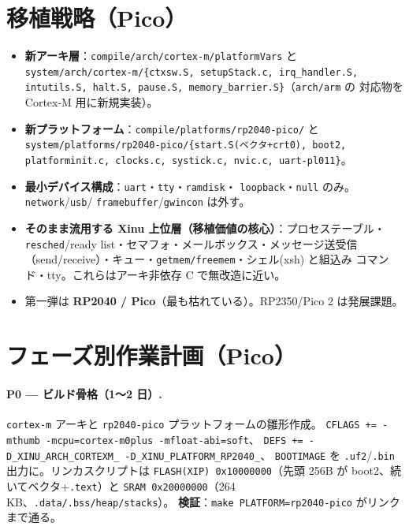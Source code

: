 \documentclass[a4paper,11pt]{ltjsarticle}
\newcommand{\cmd}[1]{\texttt{#1}}
\begin{document}
\section{移植戦略（Pico）}
\begin{itemize}[noitemsep]
  \item \textbf{新アーキ層}：\texttt{compile/arch/cortex-m/platformVars} と
        \texttt{system/arch/cortex-m/\{ctxsw.S, setupStack.c, irq\_handler.S,
        intutils.S, halt.S, pause.S, memory\_barrier.S\}}（\texttt{arch/arm} の
        対応物を Cortex-M 用に新規実装）。
  \item \textbf{新プラットフォーム}：\texttt{compile/platforms/rp2040-pico/} と
        \texttt{system/platforms/rp2040-pico/\{start.S(ベクタ+crt0), boot2,
        platforminit.c, clocks.c, systick.c, nvic.c, uart-pl011\}}。
  \item \textbf{最小デバイス構成}：\texttt{uart}・\texttt{tty}・\texttt{ramdisk}・
        \texttt{loopback}・\texttt{null} のみ。\texttt{network}/\texttt{usb}/%
        \texttt{framebuffer}/\texttt{gwincon} は外す。
  \item \textbf{そのまま流用する Xinu 上位層（移植価値の核心）}：プロセステーブル・
        \texttt{resched}/ready list・セマフォ・メールボックス・メッセージ送受信
        （send/receive）・キュー・\texttt{getmem/freemem}・シェル(xsh) と組込み
        コマンド・tty。これらはアーキ非依存 C で無改造に近い。
  \item 第一弾は \textbf{RP2040 / Pico}（最も枯れている）。RP2350/Pico 2 は発展課題。
\end{itemize}

\section{フェーズ別作業計画（Pico）}

\paragraph{P0 — ビルド骨格（1〜2 日）.}
\texttt{cortex-m} アーキと \texttt{rp2040-pico} プラットフォームの雛形作成。
\texttt{CFLAGS += -mthumb -mcpu=cortex-m0plus -mfloat-abi=soft}、
\texttt{DEFS += -D\_XINU\_ARCH\_CORTEXM\_ -D\_XINU\_PLATFORM\_RP2040\_}、
\texttt{BOOTIMAGE} を \texttt{.uf2}/\texttt{.bin} 出力に。リンカスクリプトは
\texttt{FLASH(XIP) 0x10000000}（先頭 256B が boot2、続いてベクタ+\texttt{.text}）と
\texttt{SRAM 0x20000000}（264\,KB、\texttt{.data/.bss/heap/stacks}）。
\textbf{検証}：\cmd{make PLATFORM=rp2040-pico} がリンクまで通る。
\end{document}
